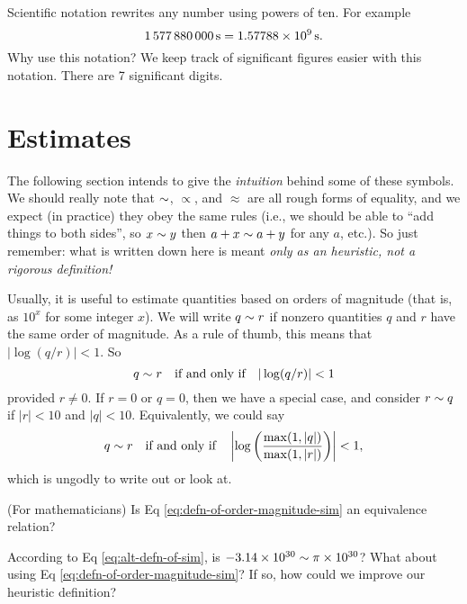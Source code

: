 Scientific notation rewrites any number using powers of ten.
For example
\begin{equation}
\SI{1577880000}{\second}
=\SI[parse-numbers = false]{1.57788\times10^{9}}{\second}.
\end{equation}
Why use this notation? We keep track of significant figures
easier with this notation. There are 7 significant digits.

\section{Estimates}

\begin{ddanger}
The following section intends to give the \emph{intuition} behind some
of these symbols. We should really note that $\sim$, $\propto$, and
$\approx$ are all rough forms of equality, and we expect (in practice)
they obey the same rules (i.e., we should be able to ``add things to
both sides'', so $x\sim y$ then $a+x\sim a+y$ for any $a$, etc.). So
just remember: what is written down here is meant 
\emph{only as an heuristic, not a rigorous definition!}
\end{ddanger}

Usually, it is useful to estimate quantities based on orders of
magnitude (that is, as $10^{x}$ for some integer $x$). We will write 
$q\sim r$ if nonzero quantities $q$ and $r$ have the same order of
magnitude. As a rule of thumb, this means that $|\log(q/r)|< 1$. So
\begin{equation}\label{eq:defn-of-order-magnitude-sim}
q\sim r\quad\mbox{if and only if}\quad |\log(q/r)|< 1
\end{equation}
provided $r\neq0$. If $r=0$ or $q=0$, then we have a special case, and
consider $r\sim q$ if $|r|<10$ and $|q|<10$. Equivalently, we could say
\begin{equation}\label{eq:alt-defn-of-sim}
q\sim r\quad\mbox{if and only if}\quad \left|\log\left(\frac{\max(1,
|q|)}{\max(1, |r|)}\right)\right| < 1,
\end{equation}
which is ungodly to write out or look at.

 (For mathematicians) Is Eq \eqref{eq:defn-of-order-magnitude-sim}
an equivalence relation?

 According to Eq \eqref{eq:alt-defn-of-sim}, is
$-3.14\times10^{30}\sim\pi\times10^{30}$? What about using Eq \eqref{eq:defn-of-order-magnitude-sim}?
If so, how could we improve our heuristic definition?

